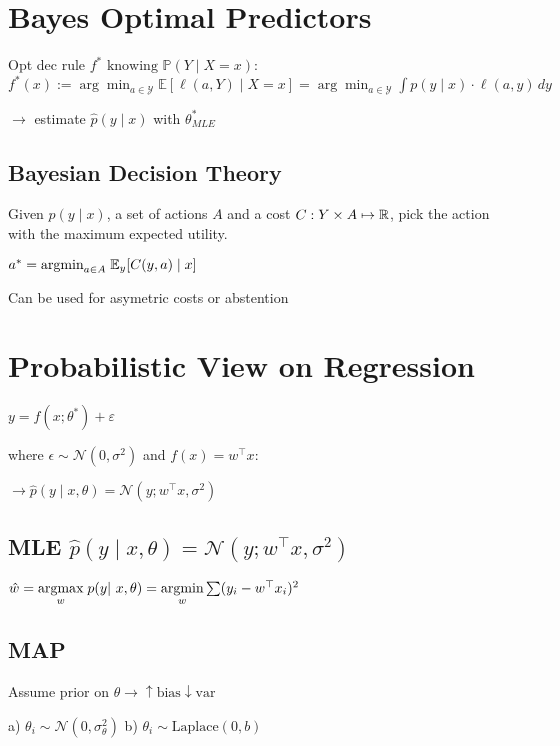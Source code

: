 \section*{Bayes Optimal Predictors}

Opt dec rule $f^* \text{ knowing } \mathbb{P}(Y \mid X=x)$:
$f^*(x) := \arg \min_{a \in \mathcal{Y}} \mathbb{E} [\ell(a, Y) \mid X = x] = \arg \min_{a \in \mathcal{Y}} \int p(y \mid x) \cdot \ell(a, y) \, dy$

$\rightarrow$ estimate $\hat{p}(y \mid x)$ with $\theta^*_{MLE}$

\subsection*{Bayesian Decision Theory}

Given $p(y \; | \; x)$, a set of actions $A$ and a cost $C: Y \times A \mapsto \mathbb{R}$, pick the action with the maximum expected utility. 

\qquad \qquad $a^* = \text{argmin}_{a \in A} \; \mathbb{E}_y[C(y,a) \; | \; x]$

Can be used for asymetric costs or abstention

\section*{Probabilistic View on Regression}

$y = f(x; \theta^*) + \varepsilon$ 

where $\epsilon \sim \mathcal{N}(0, \sigma^2)$ and $f(x) = w^\top x$:

$ \rightarrow \hat p(y \; | \; x, \theta) = \mathcal{N}(y; w^\top x, \sigma^2)$


\subsection*{MLE \color{black}$\hat p(y \; | \; x, \theta) = \mathcal{N}(y; w^\top x, \sigma^2)$}

$\hat w = \argmax{w} \; p(y | x, \theta) =\argmin{w} \sum (y_i - w^\top x_i)^2$

\subsection*{MAP}

Assume prior on $\theta \rightarrow \uparrow \text{bias} \downarrow \text{var}$ 

a) $\theta_i \sim \mathcal{N}(0, \sigma^2_\theta)$ b) $\theta_i \sim \text{Laplace}(0, b)$

